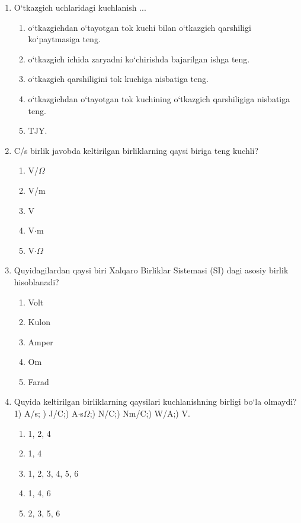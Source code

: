 \begin{enumerate}
\item O‘tkazgich uchlaridagi kuchlanish ...
\begin{enumerate}[label=\Alph*)]
\item o‘tkazgichdan o‘tayotgan tok kuchi bilan o‘tkazgich qarshiligi ko‘paytmasiga teng.
\item o‘tkazgich ichida zaryadni ko‘chirishda bajarilgan ishga teng.
\item o‘tkazgich qarshiligini tok kuchiga nisbatiga teng.
\item o‘tkazgichdan o‘tayotgan tok kuchining o‘tkazgich qarshiligiga nisbatiga teng.
\item TJY.
\end{enumerate}

\item C/s birlik javobda keltirilgan birliklarning qaysi biriga teng kuchli?
\begin{enumerate}[label=\Alph*)]
\item V/$\Omega$
\item V/m
\item V
\item V$\cdot$m
\item V$\cdot\Omega$
\end{enumerate}

\item Quyidagilardan qaysi biri Xalqaro Birliklar Sistemasi (SI) dagi asosiy birlik hisoblanadi?
\begin{enumerate}[label=\Alph*)]
\item Volt
\item Kulon
\item Amper
\item Om
\item Farad
\end{enumerate}

\item Quyida keltirilgan birliklarning qaysilari kuchlanishning birligi bo‘la olmaydi?\\
1) A/s; ) J/C;) A$\cdot$s$\Omega$;) N/C;) Nm/C;) W/A;) V.

\begin{enumerate}[label=\Alph*)]
\item 1, 2, 4
\item 1, 4
\item 1, 2, 3, 4, 5, 6
\item 1, 4, 6
\item 2, 3, 5, 6
\end{enumerate}


\end{enumerate}
